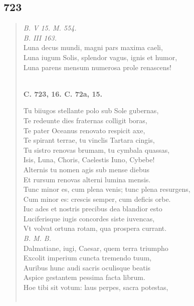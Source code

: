 \documentclass[11pt, a4paper]{report}
\begin{document}
            \subsection*{723}
      \begin{verse}
      \textit{B. V 15. M. 554.} \\ \textit{B. III 163.} \\ Luna decus mundi, magni pars maxima caeli, \\ Luna iugum Solis, splendor vagus, ignis et humor, \\ Luna parens mensum numerosa prole renascens! \\ 
        ﻿\pagebreak 
     \marginpar{[208]} \begin{center} \textbf{C. 723, 16. C. 72a, 15.} \end{center}Tu biiugos stellante polo sub Sole gubernas, \\ Te redeunte dies fraternas colligit boras, \\ Te pater Oceanus renovato respicit axe, \\ Te spirant terrae, tu vinclis Tartara cingis, \\ Tu sistro renovas brumam, tu cymbala quassas, \\ Isis, Luna, Choris, Caelestis Iuno, Cybebe! \\ Alternis tu nomen agis sub mense diebus \\ Et rursum renovas alterni lumina mensis. \\ Tunc minor es, cum plena venis; tunc plena resurgens, \\ Cum minor es: crescis semper, cum deficis orbe. \\ Iuc ades et nostris precibus dea blandior esto \\ Luciferisque iugis concordes siste iuvencas, \\ Vt volvat ortuna rotam, qua prospera currant. \\ \textit{B. M. B.} \\ Dalmatiane, iugi, Caesar, quem terra triumpho \\ Excolit imperium cuncta tremendo tuum, \\ Auribus hunc audi sacris oculisque beatis \\ Aspice gestantem pessima facta librum. \\ Hoe tibi sit votum: laus perpes, sacra potestas, \\ 
        ﻿\pagebreak 

\end{verse}
\end{document}
